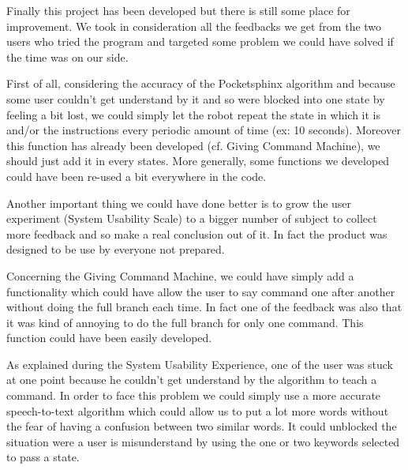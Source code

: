 Finally this project has been developed but there is still some place for improvement. We took in consideration all the feedbacks we get from the two users who tried the program and targeted some problem we could have solved if the time was on our side. 

First of all, considering the accuracy of the Pocketsphinx algorithm and because some user couldn't get understand by it and so were blocked into one state by feeling a bit lost, we could simply let the robot repeat the state in which it is and/or the instructions every periodic amount of time (ex: 10 seconds). Moreover this function has already been developed (cf. Giving Command Machine), we should just add it in every states. More generally, some functions we developed could have been re-used a bit everywhere in the code. 

Another important thing we could have done better is to grow the user experiment (System Usability Scale) to a bigger number of subject to collect more feedback and so make a real conclusion out of it. In fact the product was designed to be use by everyone not prepared.

Concerning the Giving Command Machine, we could have simply add a functionality which could have allow the user to say command one after another without doing the full branch each time. In fact one of the feedback was also that it was kind of annoying to do the full branch for only one command. This function could have been easily developed.

As explained during the System Usability Experience, one of the user was stuck at one point because he couldn't get understand by the algorithm to teach a command. In order to face this problem we could simply use a more accurate speech-to-text algorithm which could allow us to put a lot more words without the fear of having a confusion between two similar words. It could unblocked the situation were a user is misunderstand by using the one or two keywords selected to pass a state.

